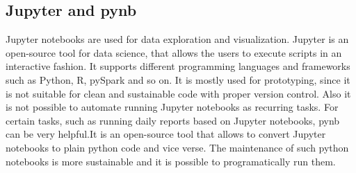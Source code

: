 \subsection{Jupyter and pynb}
Jupyter notebooks are used for data exploration and visualization. Jupyter is an open-source tool for data science, that allows the users to execute scripts in an interactive fashion. It supports different programming languages and frameworks such as Python, R, pySpark and so on. It is mostly used for prototyping, since it is not suitable for clean and sustainable code with proper version control. Also it is not possible to automate running Jupyter notebooks as recurring tasks. 
For certain tasks, such as running daily reports based on Jupyter notebooks, pynb can be very helpful.It is an open-source tool that allows to convert Jupyter notebooks to plain python code and vice verse. The maintenance of such python notebooks is more sustainable and it is possible to programatically run them. \cite{pynb}